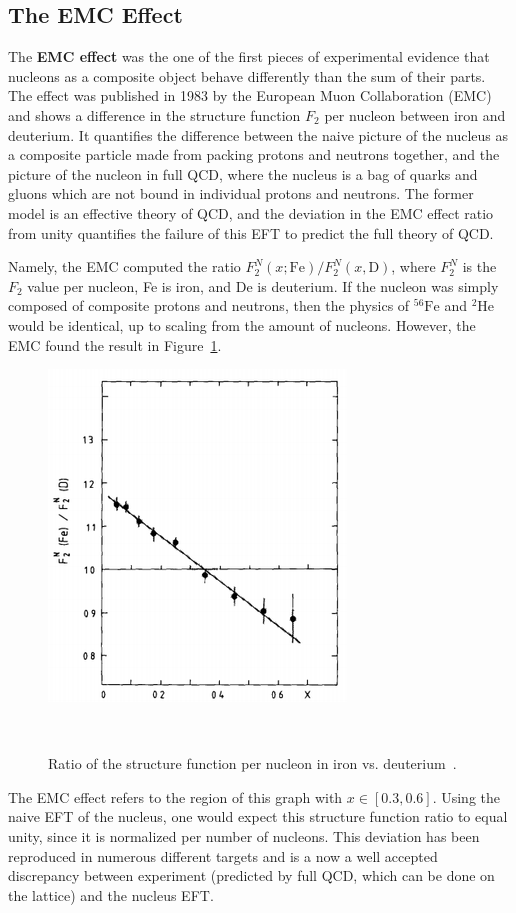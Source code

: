 \documentclass[11pt, oneside]{article}   	%
\theoremstyle{definition}
\begin{document}
\subsection{The EMC Effect}

The \textbf{EMC effect} was the one of the first pieces of experimental evidence that nucleons as a composite object behave differently than 
the sum of their parts. The effect was published in 1983 by the European Muon Collaboration (EMC)~\cite{emc_effect} and shows a difference
in the structure function $F_2$ per nucleon between iron and deuterium. It quantifies the difference between the naive picture of the nucleus 
as a composite particle made from packing protons and neutrons together, and the picture of the nucleon in full QCD, where the nucleus is a 
bag of quarks and gluons which are not bound in individual protons and neutrons. The former model is an effective theory of QCD, and the 
deviation in the EMC effect ratio from unity quantifies the failure of this EFT to predict the full theory of QCD.

Namely, the EMC computed the ratio $F_2^N(x; \mathrm{Fe}) / F_2^N(x, \mathrm{D})$, where $F_2^N$ is the $F_2$ value per nucleon, Fe is 
iron, and De is deuterium. If the nucleon was simply composed of composite protons and neutrons, then the physics of $^{56}\mathrm{Fe}$ 
and $^2\mathrm{He}$ would be identical, up to scaling from the amount of nucleons. However, the EMC found the result in 
Figure~\ref{fig:emc_effect}. 
\begin{figure}[H]
	\centering
	\includegraphics[width = .5\textwidth]{emc_effect}
	\caption{Ratio of the structure function per nucleon in iron vs. deuterium~\cite{emc_effect}.}~
	\label{fig:emc_effect}
\end{figure}

The EMC effect refers to the region of this graph with $x\in [0.3, 0.6]$. Using the naive EFT of the nucleus, one would expect this structure 
function ratio to equal unity, since it is normalized per number of nucleons. This deviation has been reproduced in numerous different targets 
and is a now a well accepted discrepancy between experiment (predicted by full QCD, which can be done on the lattice) and the nucleus 
EFT.
\end{document}
